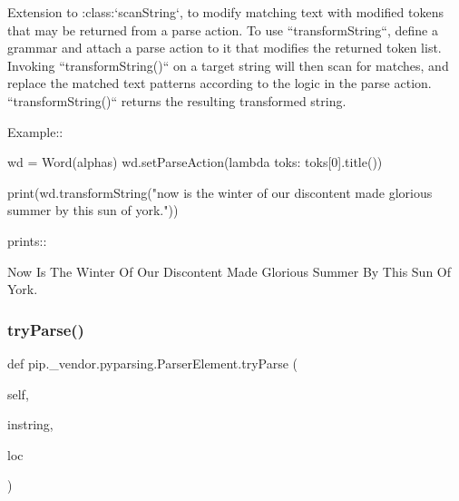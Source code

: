 \begin{DoxyVerb}Extension to :class:`scanString`, to modify matching text with modified tokens that may
be returned from a parse action.  To use ``transformString``, define a grammar and
attach a parse action to it that modifies the returned token list.
Invoking ``transformString()`` on a target string will then scan for matches,
and replace the matched text patterns according to the logic in the parse
action.  ``transformString()`` returns the resulting transformed string.

Example::

    wd = Word(alphas)
    wd.setParseAction(lambda toks: toks[0].title())

    print(wd.transformString("now is the winter of our discontent made glorious summer by this sun of york."))

prints::

    Now Is The Winter Of Our Discontent Made Glorious Summer By This Sun Of York.
\end{DoxyVerb}
 \mbox{\label{classpip_1_1__vendor_1_1pyparsing_1_1ParserElement_a5ae937dc1d5970a3838ac12b7c64cfac}} 
\subsubsection{\texorpdfstring{try\+Parse()}{tryParse()}}
{\footnotesize\ttfamily def pip.\+\_\+vendor.\+pyparsing.\+Parser\+Element.\+try\+Parse (\begin{DoxyParamCaption}\item[{}]{self,  }\item[{}]{instring,  }\item[{}]{loc }\end{DoxyParamCaption})}

\mbox{\label{classpip_1_1__vendor_1_1pyparsing_1_1ParserElement_a1d25d80ae58b896335bcc7ff23c71524}} 
